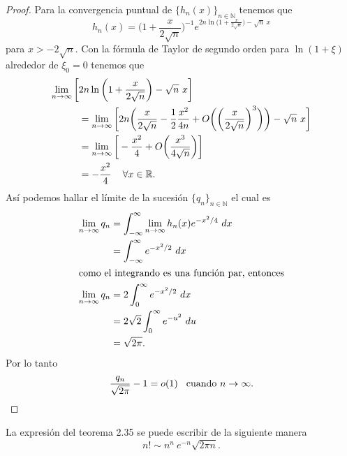 \begin{proof}
	Para la convergencia puntual de $\{h_n(x)\}_{n \in \mathbb{N}}$ tenemos que $$h_n(x) = \bigg(1+\frac{x}{2\sqrt{n}}\bigg)^{-1}e^{2n\ln \big(1+\frac{x}{2\sqrt{n}}\big)-\sqrt{n}\ x}$$ para $x > -2\sqrt{n}.$ Con la fórmula de Taylor de segundo orden para $\ln (1+\xi)$ alrededor de $\xi_0 = 0$ tenemos que
	\begin{align*}
		\lim_{n \rightarrow \infty}\bigg[&2n \ln \bigg(1+\frac{x}{2\sqrt{n}}\bigg)-\sqrt{n}\ x\bigg]\\
		&= \lim_{n \rightarrow \infty}\bigg[2n\bigg(\frac{x}{2\sqrt{n}}-\frac{1}{2}\frac{x^2}{4n}+O\bigg(\bigg(\frac{x}{2\sqrt{n}}\bigg)^3\bigg)\bigg)-\sqrt{n}\ x\bigg]\\
		&= \lim_{n \rightarrow \infty}\bigg[-\frac{x^2}{4}+O\bigg(\frac{x^3}{4\sqrt{n}}\bigg)\bigg]\\
		&= -\frac{x^2}{4}\hspace{0.4cm}\forall x \in \mathbb{R}.
	\end{align*}
	Así podemos hallar el límite de la sucesión $\{q_n\}_{n \in \mathbb{N}}$ el cual es
	\begin{align*}
		\lim_{n \rightarrow \infty}q_n &= \int_{-\infty}^{\infty}\lim_{n \rightarrow \infty}h_n(x)e^{-x^2/4}\ dx\\
		&= \int_{-\infty}^{\infty}e^{-x^2/2}\ dx\\
		\intertext{como el integrando es una función par, entonces}
		\lim_{n \rightarrow \infty}q_n &= 2\int_{0}^{\infty}e^{-x^2/2}\ dx\\
		&= 2\sqrt{2}\int_{0}^{\infty}e^{-u^2}\ du\\
		&= \sqrt{2\pi}.
	\end{align*}
	Por lo tanto $$\frac{q_n}{\sqrt{2\pi}}-1 = o(1)\hspace{0.3cm}\textrm{cuando }n \rightarrow \infty.$$
\end{proof}
La expresión del teorema 2.35 se puede escribir de la siguiente manera $$n! \sim n^n\ e^{-n}\sqrt{2\pi n}.$$

